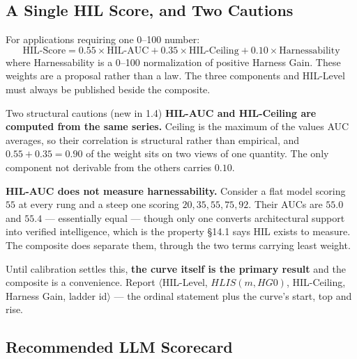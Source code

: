 \documentclass[11pt]{article}
\theoremstyle{definition}
\begin{document}
\subsection{A Single HIL Score, and Two Cautions}\label{sec:composite}

For applications requiring one 0--100 number:
\begin{equation}
\text{HIL-Score} = 0.55 \times \text{HIL-AUC} + 0.35 \times \text{HIL-Ceiling} + 0.10 \times \text{Harnessability}
\end{equation}
where Harnessability is a 0--100 normalization of positive Harness Gain. These weights are a proposal rather than a law. The three components and HIL-Level must always be published beside the composite.

\begin{cautionbox}{Two structural cautions (new in 1.4)}
\textbf{HIL-AUC and HIL-Ceiling are computed from the same series.} Ceiling is the maximum of the values AUC averages, so their correlation is structural rather than empirical, and $0.55 + 0.35 = 0.90$ of the weight sits on two views of one quantity. The only component not derivable from the others carries $0.10$.

\textbf{HIL-AUC does not measure harnessability.} Consider a flat model scoring $55$ at every rung and a steep one scoring $20, 35, 55, 75, 92$. Their AUCs are $55.0$ and $55.4$ --- essentially equal --- though only one converts architectural support into verified intelligence, which is the property \S14.1 says HIL exists to measure. The composite does separate them, through the two terms carrying least weight.

Until calibration settles this, \textbf{the curve itself is the primary result} and the composite is a convenience. Report $\langle$HIL-Level, $HLIS(m,HG0)$, HIL-Ceiling, Harness Gain, ladder id$\rangle$ --- the ordinal statement plus the curve's start, top and rise.
\end{cautionbox}

\subsection{Recommended LLM Scorecard}
\end{document}
